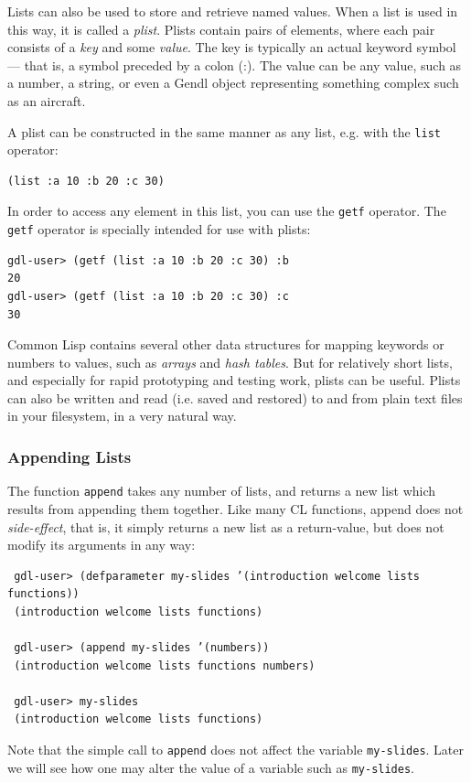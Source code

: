 \documentclass [11pt]{book}
\begin{document}
\label{subsubsec:usingalisttostoreandretrievenamedvalues}

Lists can also be used to store and retrieve named values. When a list is used in this way, 
it is called a \emph{plist}. Plists contain pairs of elements, where each pair consists of a \emph{key} and some \emph{value}. The key is typically an actual keyword symbol --- that is,
a symbol preceded by a colon (:). The value can be any value, such as
a number, a string, or even a Gendl object representing something
complex such as an aircraft.

A plist can be constructed in the same manner as any list, e.g. with the \texttt{list} operator:

\begin{verbatim}(list :a 10 :b 20 :c 30)
\end{verbatim}In order to access any element in this list, you can use the \texttt{getf} operator. The \texttt{getf} operator is specially intended for use with plists:

\begin{verbatim}gdl-user> (getf (list :a 10 :b 20 :c 30) :b
20
gdl-user> (getf (list :a 10 :b 20 :c 30) :c
30
\end{verbatim} Common Lisp contains several other data structures for mapping keywords or numbers to values, such
as \emph{arrays} and \emph{hash tables}. But for relatively short lists, and especially for rapid prototyping and testing work, plists
can be useful. Plists can also be written and read (i.e. saved and restored) to and from plain text files
in your filesystem, in a very natural way.

\subsubsection{Appending Lists}

\label{subsubsec:appendinglists}

The function \texttt{append} takes any number of lists, and returns a new list which results from
appending them together. Like many CL functions, append does not \emph{side-effect}, that is, it simply returns a new list as a return-value, but does not modify its 
arguments in any way:

\begin{verbatim}
 gdl-user> (defparameter my-slides ’(introduction welcome lists functions))
 (introduction welcome lists functions)

 gdl-user> (append my-slides ’(numbers))
 (introduction welcome lists functions numbers)

 gdl-user> my-slides
 (introduction welcome lists functions)
\end{verbatim}Note that the simple call to \texttt{append} does not affect the variable \texttt{my-slides}. Later we will see how one may alter the value of a variable such as \texttt{my-slides}.
\end{document}
